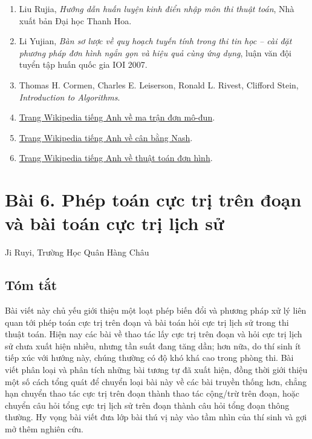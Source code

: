 \documentclass[11pt]{article}
\begin{document}
\begin{enumerate}
  \item Liu Rujia, \emph{Hướng dẫn huấn luyện kinh điển nhập môn thi thuật
  toán}, Nhà xuất bản Đại học Thanh Hoa.
  \item Li Yujian, \emph{Bàn sơ lược về quy hoạch tuyến tính trong thi tin học
  -- cài đặt phương pháp đơn hình ngắn gọn và hiệu quả cùng ứng dụng}, luận
  văn đội tuyển tập huấn quốc gia IOI 2007.
  \item Thomas H. Cormen, Charles E. Leiserson, Ronald L. Rivest, Clifford
  Stein, \emph{Introduction to Algorithms}.
  \item \href{https://en.wikipedia.org/wiki/Unimodular_matrix}{Trang Wikipedia
  tiếng Anh về ma trận đơn mô-đun}.
  \item \href{https://en.wikipedia.org/wiki/Nash_equilibrium}{Trang Wikipedia
  tiếng Anh về cân bằng Nash}.
  \item \href{https://en.wikipedia.org/wiki/Simplex_algorithm}{Trang Wikipedia
  tiếng Anh về thuật toán đơn hình}.
\end{enumerate}

\section*{Bài 6. Phép toán cực trị trên đoạn và bài toán cực trị lịch sử}

\begin{center}
Ji Ruyi, Trường Học Quân Hàng Châu
\end{center}

\subsection*{Tóm tắt}

Bài viết này chủ yếu giới thiệu một loạt phép biến đổi và phương pháp xử lý
liên quan tới phép toán cực trị trên đoạn và bài toán hỏi cực trị lịch sử
trong thi thuật toán. Hiện nay các bài về thao tác lấy cực trị trên đoạn và
hỏi cực trị lịch sử chưa xuất hiện nhiều, nhưng tần suất đang tăng dần; hơn
nữa, do thí sinh ít tiếp xúc với hướng này, chúng thường có độ khó khá cao
trong phòng thi. Bài viết phân loại và phân tích những bài tương tự đã xuất
hiện, đồng thời giới thiệu một số cách tổng quát để chuyển loại bài này về
các bài truyền thống hơn, chẳng hạn chuyển thao tác cực trị trên đoạn thành
thao tác cộng/trừ trên đoạn, hoặc chuyển câu hỏi tổng cực trị lịch sử trên
đoạn thành câu hỏi tổng đoạn thông thường. Hy vọng bài viết đưa lớp bài thú
vị này vào tầm nhìn của thí sinh và gợi mở thêm nghiên cứu.
\end{document}
